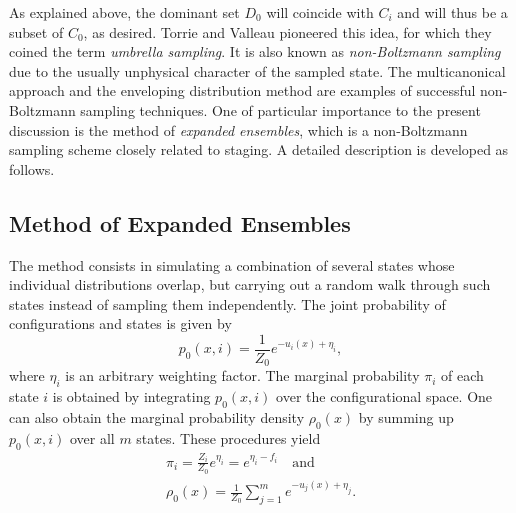 \documentclass[aip,jcp,reprint,amsmath,amssymb]{revtex4-1}
\begin{document}
As explained above, the dominant set $D_0$ will coincide with $C_i$ and will thus be a subset of $C_0$, as desired. Torrie and Valleau\cite{Torrie_1977} pioneered this idea, for which they coined the term \textit{umbrella sampling}. It is also known as \textit{non-Boltzmann sampling} due to the usually unphysical character of the sampled state. The multicanonical approach\cite{Berg_1992, Lee_1993, Abreu_2006} and the enveloping distribution method\cite{Christ_2007, *Christ_2008, *Christ_2009} are examples of successful non-Boltzmann sampling techniques. One of particular importance to the present discussion is the method of \textit{expanded ensembles},\cite{Lyubartsev_1992} which is a non-Boltzmann sampling scheme closely related to staging. A detailed description is developed as follows.

\subsection{Method of Expanded Ensembles}

The method consists in simulating a combination of several states whose individual distributions overlap, but carrying out a random walk through such states instead of sampling them independently. The joint probability of configurations and states is given by\cite{Nymeyer_2010}
\begin{equation}
\label{eq:expanded ensemble joint}
p_0(x, i) = \frac{1}{Z_0} e^{-u_i(x) + \eta_i},
\end{equation}
where $\eta_i$ is an arbitrary weighting factor. The marginal probability $\pi_i$ of each state $i$ is obtained by integrating $p_0(x,i)$ over the configurational space. One can also obtain the marginal probability density $\rho_0(x)$ by summing up $p_0(x,i)$ over all $m$ states. These procedures yield
\begin{align}
\pi_i = \frac{Z_i}{Z_0} e^{\eta_i} = e^{\eta_i - f_i} \quad \text{and} \label{eq:expanded ensemble prior} \\
\rho_0(x) = \frac{1}{Z_0} \sum_{j=1}^m e^{-u_j(x) + \eta_j}. \label{eq:expanded ensemble evidence}
\end{align}
\end{document}
